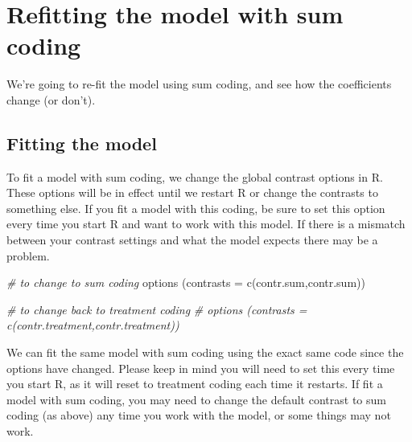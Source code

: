 \documentclass[
]{book}
\newenvironment{Shaded}{\begin{snugshade}}{\end{snugshade}}
\newcommand{\AttributeTok}[1]{\textcolor[rgb]{0.77,0.63,0.00}{#1}}
\newcommand{\CommentTok}[1]{\textcolor[rgb]{0.56,0.35,0.01}{\textit{#1}}}
\newcommand{\FunctionTok}[1]{\textcolor[rgb]{0.00,0.00,0.00}{#1}}
\newcommand{\NormalTok}[1]{#1}
\newcommand{\StringTok}[1]{\textcolor[rgb]{0.31,0.60,0.02}{#1}}
\begin{document}
\hypertarget{refitting-the-model-with-sum-coding}{%
\section{Refitting the model with sum coding}\label{refitting-the-model-with-sum-coding}}

We're going to re-fit the model using sum coding, and see how the coefficients change (or don't).

\hypertarget{fitting-the-model-2}{%
\subsection{Fitting the model}\label{fitting-the-model-2}}

To fit a model with sum coding, we change the global contrast options in R. These options will be in effect until we restart R or change the contrasts to something else. If you fit a model with this coding, be sure to set this option every time you start R and want to work with this model. If there is a mismatch between your contrast settings and what the model expects there may be a problem.

\begin{Shaded}
\begin{Highlighting}[]
\CommentTok{\# to change to sum coding}
\FunctionTok{options}\NormalTok{ (}\AttributeTok{contrasts =} \FunctionTok{c}\NormalTok{(}\StringTok{\textquotesingle{}contr.sum\textquotesingle{}}\NormalTok{,}\StringTok{\textquotesingle{}contr.sum\textquotesingle{}}\NormalTok{))}

\CommentTok{\# to change back to treatment coding}
\CommentTok{\# options (contrasts = c(\textquotesingle{}contr.treatment\textquotesingle{},\textquotesingle{}contr.treatment\textquotesingle{}))}
\end{Highlighting}
\end{Shaded}

We can fit the same model with sum coding using the exact same code since the options have changed. Please keep in mind you will need to set this every time you start R, as it will reset to treatment coding each time it restarts. If fit a model with sum coding, you may need to change the default contrast to sum coding (as above) any time you work with the model, or some things may not work.
\end{document}
